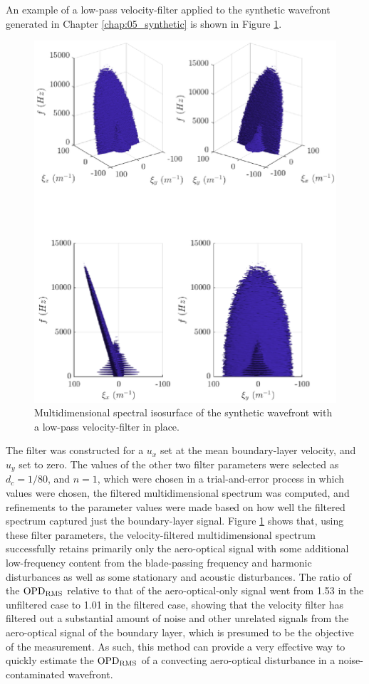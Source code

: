 An example of a low-pass velocity-filter applied to the synthetic wavefront generated in Chapter \ref{chap:05_synthetic} is shown in Figure \ref{fig:06_filter_velocity}.
\begin{figure}
 \centering
 \includegraphics{../matlab/06_single_sensor_filtering/filter_velocity.eps}
 \caption{Multidimensional spectral isosurface of the synthetic wavefront with a low-pass velocity-filter in place.}
 \label{fig:06_filter_velocity}
\end{figure}
The filter was constructed for a $u_x$ set at the mean boundary-layer velocity, and $u_y$ set to zero.
The values of the other two filter parameters were selected as $d_c=1/80$, and $n=1$, which were chosen in a trial-and-error process in which values were chosen, the filtered multidimensional spectrum was computed, and refinements to the parameter values were made based on how well the filtered spectrum captured just the boundary-layer signal.
Figure \ref{fig:06_filter_velocity} shows that, using these filter parameters, the  velocity-filtered multidimensional spectrum successfully retains primarily only the aero-optical signal with some additional low-frequency content from the blade-passing frequency and harmonic disturbances as well as some stationary and acoustic disturbances.
The ratio of the $\operatorname{OPD_{RMS}}$ relative to that of the aero-optical-only signal went from 1.53 in the unfiltered case to 1.01 in the filtered case, showing that the velocity filter has filtered out a substantial amount of noise and other unrelated signals from the aero-optical signal of the boundary layer, which is presumed to be the objective of the measurement.
As such, this method can provide a very effective way to quickly estimate the $\operatorname{OPD_{RMS}}$ of a convecting aero-optical disturbance in a noise-contaminated wavefront.

